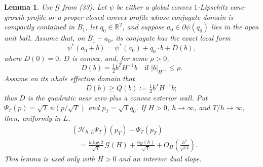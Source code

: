 \documentclass{aomart}
\newtheorem{lemma}[theorem]{Lemma}
\theoremstyle{definition}
\newcommand{\1}{\mathbf 1}
\begin{document}
\begin{lemma}\label{lem:nonlinear-consistency}
Use $\mathcal G$ from (33).  Let $\psi$ be either a global convex
$1$-Lipschitz cone-growth profile or a proper closed convex profile
whose conjugate domain is compactly contained in $B_ 1$,
let $q_ 0\in\mathbb R^2$, and suppose
$a_ 0\in\partial\psi(q_ 0)$ lies in the open unit ball.  Assume that,
on $\overline B_ 1-a_ 0$, its conjugate has the exact local form
\begin{equation}
\psi^*(a_ 0+b)=\psi^*(a_ 0)+q_ 0\cdot b+D(b),
\tag{34}
\end{equation}
where $D(0)=0$, $D$ is convex, and, for some $\rho>0$,
\begin{equation}
D(b)=\tfrac12b^TH^{-1}b\quad\text{if }|b|_ {H^{-1}}\leq\rho.
\tag{34a}
\end{equation}
Assume on its whole effective domain that
\begin{equation*}
D(b)\geq Q(b):=\tfrac12b^TH^{-1}b;
\end{equation*}
thus $D$ is the quadratic near zero plus a convex exterior wall.  Put
$\Psi_ T(p)=\sqrt T\,\psi(p/\sqrt T)$ and
$p_ T=\sqrt Tq_ 0$.  If $H>0$, $h\to\infty$, and
$T/h\to\infty$, then, uniformly in $L$,
\begin{equation}
\begin{split}
&(\mathcal H_ {h,L}\Psi_ T)(p_ T)-\Psi_ T(p_ T)\\
&\quad=\frac{h\log2}{\sqrt T}\,\mathcal G(H)+\frac{o_ H(h)}{\sqrt T}
+O_ H\!\left(\frac{h^2}{T^{3/2}}\right).
\end{split}
\tag{35}
\end{equation}
This lemma is used only with $H>0$ and an interior dual slope.

\end{lemma}
\end{document}
